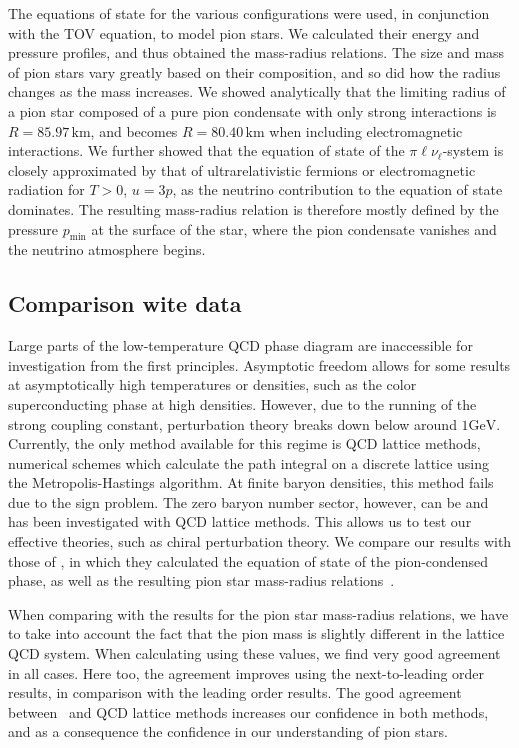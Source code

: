 The equations of state for the various configurations were used, in conjunction with the TOV equation, to model pion stars.
We calculated their energy and pressure profiles, and thus obtained the mass-radius relations.
The size and mass of pion stars vary greatly based on their composition, and so did how the radius changes as the mass increases.
We showed analytically that the limiting radius of a pion star composed of a pure pion condensate with only strong interactions is $R = 85.97\,\text{km}$, and becomes $R = 80.40\,\text{km}$ when including electromagnetic interactions.
We further showed that the equation of state of the $\pi\ell\nu_\ell$-system is closely approximated by that of ultrarelativistic fermions or electromagnetic radiation for $T>0$, $u = 3p$, as the neutrino contribution to the equation of state dominates.
The resulting mass-radius relation is therefore mostly defined by the pressure $p_\text{min}$ at the surface of the star, where the pion condensate vanishes and the neutrino atmosphere begins.


\subsection{Comparison wite data}

Large parts of the low-temperature QCD phase diagram are inaccessible for investigation from the first principles.
Asymptotic freedom allows for some results at asymptotically high temperatures or densities, such as the color superconducting phase at high densities.
However, due to the running of the strong coupling constant, perturbation theory breaks down below around $1 \text{GeV}$.
Currently, the only method available for this regime is QCD lattice methods, numerical schemes which calculate the path integral on a discrete lattice using the Metropolis-Hastings algorithm.
At finite baryon densities, this method fails due to the sign problem.
The zero baryon number sector, however, can be and has been investigated with QCD lattice methods.
This allows us to test our effective theories, such as chiral perturbation theory.
We compare our results with those of \citeauthor{brandtNewClassCompact2018}, in which they calculated the equation of state of the pion-condensed phase, as well as the resulting pion star mass-radius relations~\autocite{brandtNewClassCompact2018}.

When comparing with the results for the pion star mass-radius relations, we have to take into account the fact that the pion mass is slightly different in the lattice QCD system.
When calculating using these values, we find very good agreement in all cases.
Here too, the agreement improves using the next-to-leading order results, in comparison with the leading order results.
The good agreement between \chpt\, and QCD lattice methods increases our confidence in both methods, and as a consequence the confidence in our understanding of pion stars.



